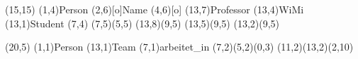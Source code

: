 \documentclass[11pt,a4paper]{article}
\begin{document}
\setlength{\unitlength}{.6cm}
\begin{schema}(15,15)
  \entity(1,4){Person}
  \attr(2,6)[o]{Name}
  \attr(4,6)[o]{}
  \relation(13,7){Professor}
  \relation(13,4){WiMi}
  \relation(13,1){Student}
  \cluster(7,4)
  \connection(7,5)(5,5){}
  \connection(13,8)(9,5){}
  \connection(13,5)(9,5){}
  \connection(13,2)(9,5){}
\end{schema}


\begin{schema}(20,5)
  \entity(1,1){Person}
  \entity(13,1){Team}
  \relation(7,1){arbeitet\_in}
  \connection(7,2)(5,2){(0,3)}
  \connection(11,2)(13,2){(2,10)}
\end{schema}
\end{document}

